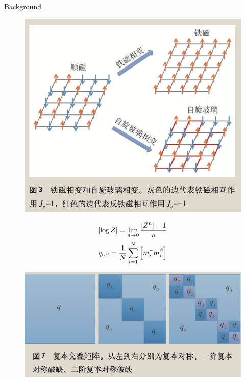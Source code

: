 \documentclass[UTF8]{beamer}
\begin{document}
\begin{frame}{Background}
\begin{minipage}[c]{0.3\linewidth}
  \end{minipage}
  \hfill
  \begin{minipage}[c]{0.3\linewidth}
    \begin{figure}
      \centering
      \includegraphics[width=0.8\linewidth]{./fig/相变.png}
    \end{figure}
  \end{minipage}
  \vfill
  \begin{minipage}[c]{0.3\linewidth}
    \small
    \begin{equation}
      \left[ \log Z \right] = \lim_{n \rightarrow 0} \frac{\left[ Z^n \right] - 1}{n} \notag
    \end{equation}
    \begin{equation}
      q_{\alpha \beta} = \frac{1}{N} \sum_{i=1}^{N} \left[ m_{i}^{\alpha} m_{i}^{\beta} \right] \notag
    \end{equation}
  \end{minipage}
  \hfill
  \begin{minipage}[c]{0.3\linewidth}
    \begin{figure}
      \centering
      \includegraphics[width=1.0\linewidth]{./fig/复本交叠矩阵.png}

\end{figure}
\end{minipage}
\end{frame}
\end{document}
